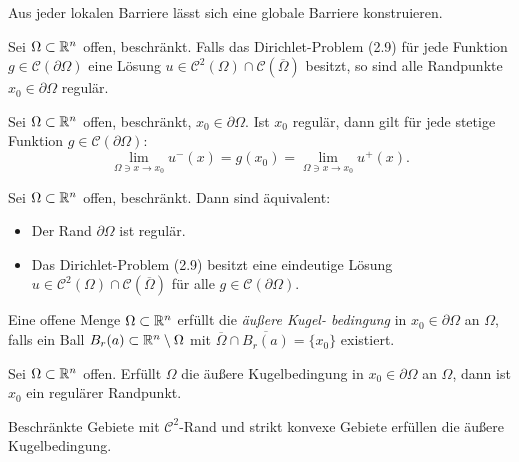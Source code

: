 \documentclass{cheat-sheet}
\begin{document}
\begin{bem}
  Aus jeder lokalen Barriere lässt sich eine globale Barriere konstruieren.
\end{bem}

\begin{lem}
  Sei $\Omega \subset \mathbb{R}^n$ offen, beschränkt. Falls das Dirichlet-Problem (2.9) für jede Funktion $g \in \mathcal{C}(\partial \Omega)$ eine Lösung $u \in \mathcal{C}^2(\Omega) \cap \mathcal{C}(\overline{\Omega})$ besitzt, so sind alle Randpunkte $x_0 \in \partial \Omega$ regulär.
\end{lem}

\begin{lem}
  Sei $\Omega \subset \mathbb{R}^n$ offen, beschränkt, $x_0 \in \partial \Omega$. Ist $x_0$ regulär, dann gilt für jede stetige Funktion $g \in \mathcal{C}(\partial \Omega)$:
  \[ \lim_{\Omega \ni x \to x_0} u^-(x) = g(x_0) = \lim_{\Omega \ni x \to x_0} u^+(x). \]
\end{lem}

\begin{satz}[Perron]
  Sei $\Omega \subset \mathbb{R}^n$ offen, beschränkt. Dann sind äquivalent:
  \begin{itemize}
    \item Der Rand $\partial \Omega$ ist regulär.
    \item Das Dirichlet-Problem (2.9) besitzt eine eindeutige Lösung $u \in \mathcal{C}^2(\Omega) \cap \mathcal{C}(\overline{\Omega})$ für alle $g \in \mathcal{C}(\partial \Omega)$.
  \end{itemize}
\end{satz}

\begin{defn}
  Eine offene Menge $\Omega \subset \mathbb{R}^n$ erfüllt die \emph{äußere Kugel- bedingung} in $x_0 \in \partial \Omega$ an $\Omega$, falls ein Ball $B_r(a) \subset \mathbb{R}^n \setminus \Omega$ mit $\overline{\Omega} \cap \overline{B_r(a)} = \{ x_0 \}$ existiert.
\end{defn}

\begin{lem}
  Sei $\Omega \subset \mathbb{R}^n$ offen. Erfüllt $\Omega$ die äußere Kugelbedingung in $x_0 \in \partial \Omega$ an $\Omega$, dann ist $x_0$ ein regulärer Randpunkt.
\end{lem}

\begin{bem}
  Beschränkte Gebiete mit $\mathcal{C}^2$-Rand und strikt konvexe Gebiete erfüllen die äußere Kugelbedingung.
\end{bem}
\end{document}
